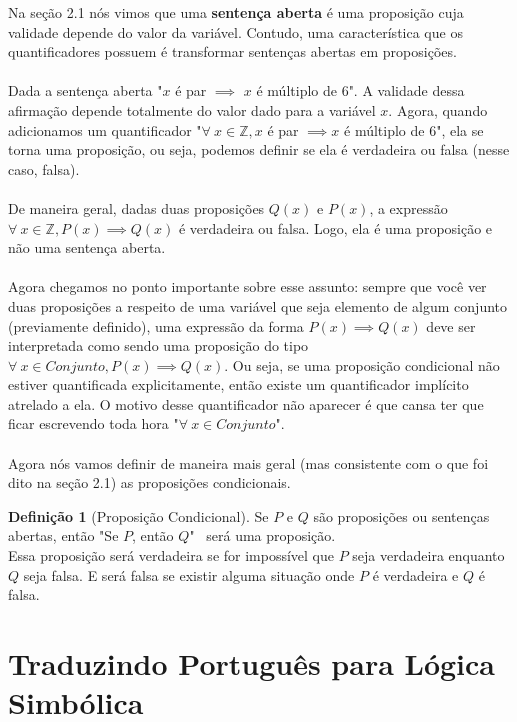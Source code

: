 \documentclass[a4paper,11pt]{book}
\theoremstyle{definition}
\theoremstyle{break}
\newtheorem{definition}{Definição}[section]
\begin{document}
Na seção 2.1 nós vimos que uma \textbf{sentença aberta} é uma proposição cuja validade depende do valor da variável. Contudo, uma característica que os quantificadores possuem é transformar sentenças abertas em proposições.
\\
\\
Dada a sentença aberta "$x$ é par $\implies$ $x$ é múltiplo de 6". A validade dessa afirmação depende totalmente do valor dado para a variável $x$. Agora, quando adicionamos um quantificador "$\forall \ x \in \mathbb{Z}, x$ é par $\implies x$ é múltiplo de 6", ela se torna uma proposição, ou seja, podemos definir se ela é verdadeira ou falsa (nesse caso, falsa).
\\
\\
De maneira geral, dadas duas proposições $Q(x)$ e $P(x)$, a expressão $\forall \ x \in \mathbb{Z}, P(x) \implies Q(x)$ é verdadeira ou falsa. Logo, ela é uma proposição e não uma sentença aberta.
\\
\\
Agora chegamos no ponto importante sobre esse assunto: sempre que você ver duas proposições a respeito de uma variável que seja elemento de algum conjunto (previamente definido), uma expressão da forma $P(x) \implies Q(x)$ deve ser interpretada como sendo uma proposição do tipo $\forall \ x \in Conjunto, P(x) \implies Q(x)$. Ou seja, se uma proposição condicional não estiver quantificada explicitamente, então existe um quantificador implícito atrelado a ela. O motivo desse quantificador não aparecer é que cansa ter que ficar escrevendo toda hora "$\forall \ x \in Conjunto$".
\\
\\
Agora nós vamos definir de maneira mais geral (mas consistente com o que foi dito na seção 2.1) as proposições condicionais.

\begin{definition}[Proposição Condicional]
Se $P$ e $Q$ são proposições ou sentenças abertas, então "Se $P$, então $Q$" \  será uma proposição.\\
Essa proposição será verdadeira se for impossível que $P$ seja verdadeira enquanto $Q$ seja falsa. E será falsa se existir alguma situação onde $P$ é verdadeira e $Q$ é falsa.
\end{definition}

\section{Traduzindo Português para Lógica Simbólica}
\end{document}
